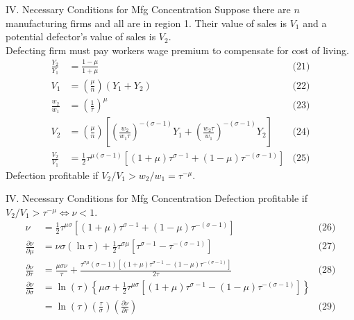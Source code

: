 \documentclass[10pt,notes=hide]{beamer}
\begin{document}
\begin{frame}{IV. Necessary Conditions for Mfg Concentration}
Suppose there are $n$ manufacturing firms and all are in region 1.
Their value of sales is $V_1$ and a potential defector's value of sales is $V_2$. \\
Defecting firm must pay workers wage premium to compensate for cost of living.
\begin{align*}
\frac{Y_2}{Y_1} 
&=
\frac{1-\mu}{1+\mu}
& \text{(21)} \\
V_1 
&=
\left(\frac{\mu}{n}\right) \left(Y_1+Y_2\right)
& \text{(22)} \\
\frac{w_2}{w_1} 
&=
\left(\frac{1}{\tau}\right)^{\mu}
& \text{(23)} \\
V_2 
&=
\left(\frac{\mu}{n}\right)\left[\left(\frac{w_2}{w_1 \tau}\right)^{-(\sigma-1)}Y_1 + \left(\frac{w_2 \tau}{w_1}\right)^{-(\sigma-1)}Y_2 \right]
& \text{(24)} \\
\frac{V_2}{V_1} 
&=
\frac{1}{2} \tau^{\mu(\sigma-1)}\left[\left(1+\mu\right)\tau^{\sigma-1} + (1-\mu)\tau^{-(\sigma-1)}\right]
& \text{(25)}
\end{align*}
Defection profitable if $V_2/V_1 > w_2 / w_1 = \tau^{-\mu}$.
\end{frame}
\begin{frame}{IV. Necessary Conditions for Mfg Concentration}
Defection profitable if $V_2/V_1 > \tau^{-\mu} \iff \nu <1$.
\begin{align*}
\nu 
&=
\frac{1}{2} \tau^{\mu\sigma}\left[\left(1+\mu\right)\tau^{\sigma-1} + (1-\mu)\tau^{-(\sigma-1)}\right]
& \text{(26)} \\
\frac{\partial\nu}{\partial\mu} 
&=
\nu\sigma(\ln\tau) + \frac{1}{2}\tau^{\sigma\mu} \left[\tau^{\sigma-1} - \tau^{-(\sigma-1)}\right]
& \text{(27)} \\
\frac{\partial\nu}{\partial\tau} 
&=
\frac{\mu\sigma\nu}{\tau} + \frac{\tau^{\sigma\mu}(\sigma-1)\left[\left(1+\mu\right)\tau^{\sigma-1} - (1-\mu)\tau^{-(\sigma-1)}\right]}{2\tau}
& \text{(28)} \\
\frac{\partial\nu}{\partial\sigma} 
&=
\ln(\tau) \left\{\mu\sigma + \frac{1}{2}\tau^{\mu\sigma}\left[\left(1+\mu\right)\tau^{\sigma-1} - (1-\mu)\tau^{-(\sigma-1)}\right]\right\}
\\
&= \ln(\tau) \left(\frac{\tau}{\sigma}\right) \left(\frac{\partial \nu}{\partial \tau}\right)
& \text{(29)} \\
\end{align*}
\end{frame}
\end{document}
